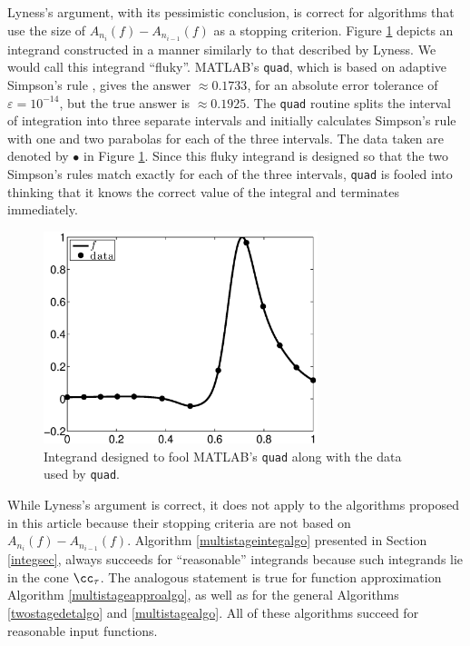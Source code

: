 \documentclass[]{elsarticle}
\theoremstyle{definition}
\theoremstyle{remark}
\begin{document}
Lyness's argument, with its pessimistic conclusion, is correct for algorithms that use the size of $A_{n_{i}}(f)-A_{n_{i-1}}(f)$ as a stopping criterion.  Figure \ref{fig:foolquad} depicts an integrand constructed in a manner similarly to that described by Lyness.  We would call this integrand ``fluky''.  MATLAB's {\tt quad}, which is based on adaptive Simpson's rule  \citep{GanGau00a}, gives the answer $\approx 0.1733$, for an absolute error tolerance of $\varepsilon=10^{-14}$, but the true answer is $\approx 0.1925$.  The {\tt quad} routine splits the interval of integration into three separate intervals and initially calculates Simpson's rule with one and two parabolas for each of the three intervals.  The data taken are denoted by $\bullet$ in Figure \ref{fig:foolquad}.  Since this fluky integrand is designed so that the two Simpson's rules match exactly for each of the three intervals, {\tt quad} is fooled into thinking that it knows the correct value of the integral and terminates immediately.

\begin{figure}
\centering 
\includegraphics[width=8cm]{foolbwquadexample.eps}
\caption{Integrand designed to fool MATLAB's {\tt quad} along with the data used by {\tt quad}. \label{fig:foolquad}}
\end{figure}

While Lyness's argument is correct, it does not apply to the algorithms proposed in this article because their stopping criteria are not based on  $A_{n_{i}}(f)-A_{n_{i-1}}(f)$.  Algorithm \ref{multistageintegalgo} presented in Section \ref{integsec}, always succeeds for ``reasonable'' integrands because such integrands lie in the cone $\cc_{\tau}$.  The analogous statement is true for function approximation Algorithm \ref{multistageapproalgo}, as well as for the general Algorithms \ref{twostagedetalgo} and \ref{multistagealgo}.  All of these algorithms succeed for reasonable input functions.  
\end{document}
